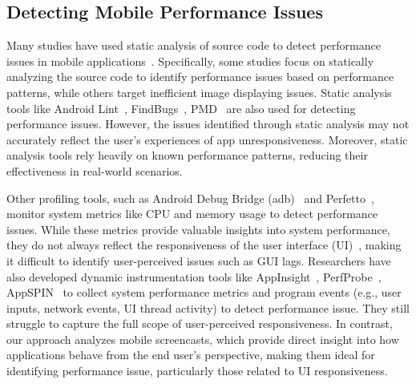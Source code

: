 \subsection{Detecting Mobile Performance Issues}
Many studies have used static analysis of source code to detect performance issues in mobile applications~\cite{2014_ICSE_Characterizing_and_detecting_performance_bugs, 2019_EMSE_iPerfDetector,2019_SANER_Characterizing_and_Detecting_Inefficient_Image_Displaying_Issues, 2020_EMSE_statically_detectable_performance_issues, 2021_ICSE_IMGDroid_Detecting_Image_Loading_Defects, 2023_ASE_Detection_Thread_Misuses}. Specifically, some studies \cite{2014_ICSE_Characterizing_and_detecting_performance_bugs, 2019_EMSE_iPerfDetector, 2023_ASE_Detection_Thread_Misuses} focus on statically analyzing the source code to identify performance issues based on performance patterns, while others \cite{2019_SANER_Characterizing_and_Detecting_Inefficient_Image_Displaying_Issues, 2021_ICSE_IMGDroid_Detecting_Image_Loading_Defects} target inefficient image displaying issues. Static analysis tools like Android Lint~\cite{Android_Lint}, FindBugs~\cite{FindBugs}, PMD~\cite{PMD} are also used for detecting performance issues.
However, the issues identified through static analysis may not accurately reflect the user's experiences of app unresponsiveness. Moreover, static analysis tools rely heavily on known performance patterns, reducing their effectiveness in real-world scenarios.

Other profiling tools, such as Android Debug Bridge (adb)~\cite{adb} and Perfetto~\cite{perfetto}, monitor  system metrics like CPU and memory usage to detect performance issues. While these metrics provide valuable insights into system performance, they do not always reflect the responsiveness of the user interface (UI)~\cite{2022_IST_resource_influences_UI_responsiveness}, making it difficult to identify user-perceived issues such as GUI lags. 
Researchers have also developed dynamic instrumentation tools like AppInsight~\cite{2012_OSDI_AppInsight}, PerfProbe~\cite{2019_MOBILESoft_PerfProbe}, AppSPIN~\cite{2022_EMSE_AppSPIN} to collect system performance metrics and program events (e.g., user inputs, network events, UI thread activity) to detect performance issue. They still struggle to capture the full scope of user-perceived responsiveness. In contrast, our approach analyzes mobile screencasts, which provide direct insight into how applications behave from the end user’s perspective, making them ideal for identifying performance issue, particularly those related to UI responsiveness.


